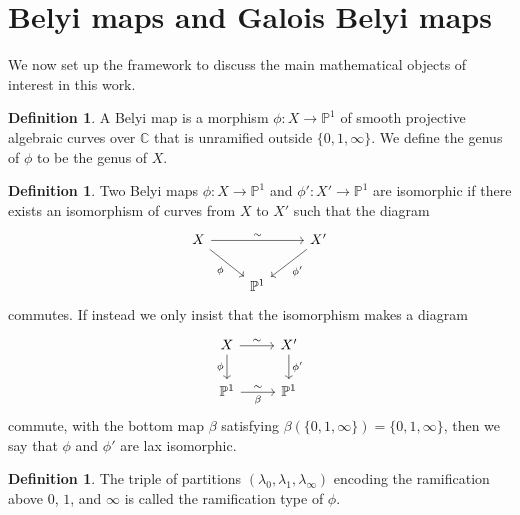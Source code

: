 \documentclass{dcthesis}
\newcommand{\PP}{\mathbb P}
\newcommand{\CC}{\mathbb C}
\newcommand{\defi}[1]{\textsf{#1}}
\numberwithin{equation}{section}
\theoremstyle{definition}
\newtheorem{definition}[equation]{Definition}
\theoremstyle{remark}
\begin{document}
{{  \section{Belyi maps and Galois Belyi maps}{\label{sec:belyimaps}
    We now set up the framework to discuss
    the main mathematical objects of interest in this work.
    \begin{definition}\label{def:belyimap}
      A
      \defi{Belyi map}
      is a morphism
      $\phi\colon X \to \PP^1$
      of
      smooth projective
      algebraic curves over $\CC$
      that is
      unramified outside
      $\{0,1,\infty\}$.
      We define the \defi{genus} of $\phi$
      to be the genus of $X$.
    \end{definition}
    \begin{definition}\label{def:belyiiso}
      Two Belyi maps
      $\phi\colon X\to\PP^1$ and
      $\phi'\colon X'\to\PP^1$
      are \defi{isomorphic}
      if there exists an isomorphism
      of curves from
      $X$ to $X'$
      such that the diagram
      \begin{equation}
        \label{eqn:belyiiso}
        \begin{tikzcd}
          X\arrow{rr}{\sim}\arrow{dr}[swap]{\phi}
          &
          &X'\arrow{dl}{\phi'}\\
          &\PP^1
        \end{tikzcd}
      \end{equation}
      commutes.
      If instead we only insist that
      the isomorphism
      makes a diagram
      \begin{equation}
        \label{eqn:}
        \begin{tikzcd}
          X\arrow{r}{\sim}\arrow{d}[swap]{\phi}&X'\arrow{d}{\phi'}\\
          \PP^1\arrow{r}{\sim}[swap]{\beta}&\PP^1
        \end{tikzcd}
      \end{equation}
      commute,
      with the bottom map
      $\beta$ satisfying
      $\beta(\{0,1,\infty\}) =
      \{0,1,\infty\}$,
      then we say that $\phi$ and $\phi'$
      are \defi{lax isomorphic}.
    \end{definition}
    \begin{definition}\label{def:ramificationtype}
      The triple of partitions
      $(\lambda_0,\lambda_1,\lambda_\infty)$
      encoding the ramification
      above
      $0$, $1$, and $\infty$
      is called
      the \defi{ramification type} of $\phi$.
    \end{definition}
}}}
\end{document}
